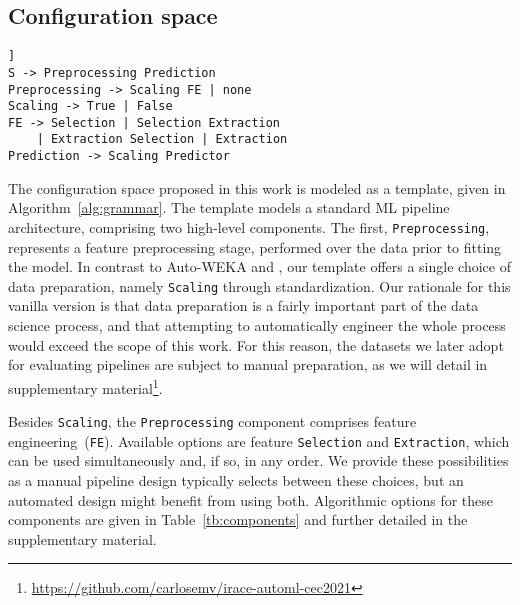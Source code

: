 \subsection{Configuration space}

\begin{lstlisting}[caption={\small \smallisklearn template described as a grammar.}, label={alg:grammar},captionpos=b, float, basicstyle=\footnotesize\ttfamily]]
S -> Preprocessing Prediction
Preprocessing -> Scaling FE | none
Scaling -> True | False
FE -> Selection | Selection Extraction 
	| Extraction Selection | Extraction
Prediction -> Scaling Predictor
\end{lstlisting}

The configuration space proposed in this work is modeled as a template, given in Algorithm~\ref{alg:grammar}. The template models a standard ML pipeline architecture, comprising two high-level components. The first, \texttt{\small Preprocessing}, represents a feature preprocessing stage, performed over the data prior to fitting the model. In contrast to Auto-WEKA and \autosklearn, our template offers a single choice of data preparation, namely \texttt{\small Scaling} through standardization. Our rationale for this vanilla version is that data preparation is a fairly important part of the data science process, and that attempting to automatically engineer the whole process would exceed the scope of this work. For this reason, the datasets we later adopt for evaluating pipelines are subject to manual preparation, as we will detail in supplementary material\footnote{\url{https://github.com/carlosemv/irace-automl-cec2021}}. 


Besides \texttt{\small Scaling}, the \texttt{\small Preprocessing} component comprises feature engineering~(\texttt{\small FE}). Available options are feature \texttt{\small Selection} and \texttt{\small Extraction}, which can be used simultaneously and, if so, in any order. We provide these possibilities as a manual pipeline design typically selects between these choices, but an automated design might benefit from using both. Algorithmic options for these components  are given in Table~\ref{tb:components} and further detailed in the supplementary material.%

